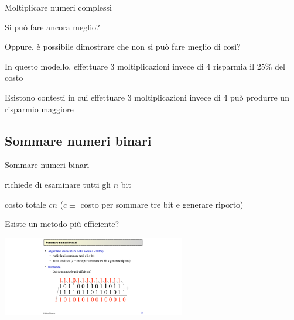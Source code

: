 \begin{frame}{Moltiplicare numeri complessi}

\BI
\item Si può fare ancora meglio? 
\item Oppure, è possibile dimostrare che non si può fare meglio di così?
\EI

\medskip
{}
\BI
\item In questo modello, effettuare 3 moltiplicazioni invece di 4 risparmia il 25\% del costo
\item Esistono contesti in cui effettuare 3 moltiplicazioni invece di 4 può produrre un risparmio maggiore
\EI

\end{frame}

\subsection{Sommare numeri binari}

\begin{frame}{Sommare numeri binari}

\begin{myboxtitle}
\BI
\item richiede di esaminare tutti gli $n$ bit
\item costo totale $cn$ ($c \equiv$ costo per sommare tre bit e generare riporto)
\EI
\end{myboxtitle}

\begin{myboxtitle}[Domanda]
Esiste un metodo più efficiente?
\end{myboxtitle}

\medskip
\begin{center}
\includegraphics[width=8cm]{sum.pdf}
\end{center}

\end{frame}

